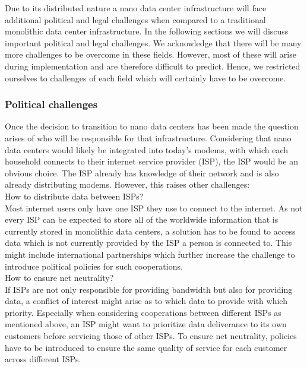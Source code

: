 Due to its distributed nature a nano data center infrastructure will face additional political and legal challenges when compared to a traditional monolithic data center infrastructure. In the following sections we will discuss important political and legal challenges. We acknowledge that there will be many more challenges to be overcome in these fields. However, most of these will arise during implementation and are therefore difficult to predict. Hence, we restricted ourselves to challenges of each field which will certainly have to be overcome.

\subsubsection{Political challenges}
Once the decision to transition to nano data centers has been made the question arises of who will be responsible for that infrastructure. Considering that nano data centers would likely be integrated into today's modems, with which each household connects to their internet service provider (ISP), the ISP would be an obvious choice. The ISP already has knowledge of their network and is also already distributing modems. However, this raises other challenges:\\

How to distribute data between ISPs?\\
Most internet users only have one ISP they use to connect to the internet. As not every ISP can be expected to store all of the worldwide information that is currently stored in monolithic data centers, a solution has to be found to access data which is not currently provided by the ISP a person is connected to. This might include international partnerships which further increase the challenge to introduce political policies for such cooperations.\\

How to ensure net neutrality?\\
If ISPs are not only responsible for providing bandwidth but also for providing data, a conflict of interest might arise as to which data to provide with which priority. Especially when considering cooperations between different ISPs as mentioned above, an ISP might want to prioritize data deliverance to its own customers before servicing those of other ISPs. To ensure net neutrality, policies have to be introduced to ensure the same quality of service for each customer across different ISPs.\\

